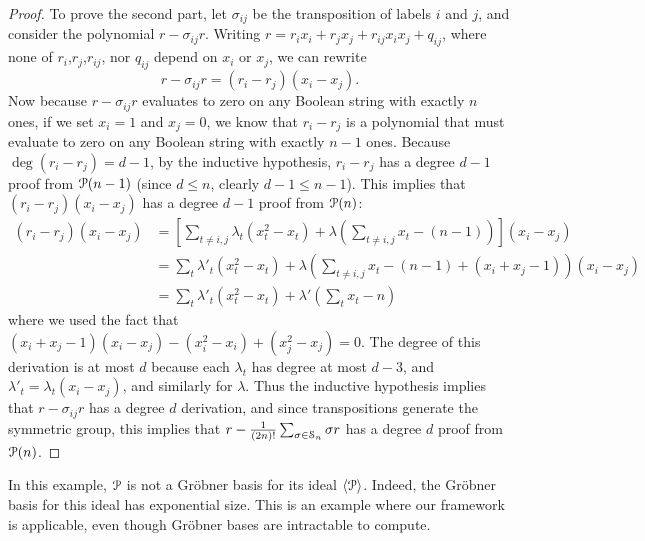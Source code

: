 \documentclass[a4paper,UKenglish]{lipics-v2016}
\begin{document}
\begin{proof}
To prove the second part, let $\sigma_{ij}$ be the transposition of labels $i$ and $j$, and consider the polynomial $r - \sigma_{ij}r$. Writing $r = r_ix_i + r_jx_j + r_{ij}x_ix_j + q_{ij}$, where none of $r_i$,$r_j$,$r_{ij}$, nor $q_{ij}$ depend on $x_i$ or $x_j$, we can rewrite
\[r - \sigma_{ij}r = (r_i - r_j)(x_i - x_j).\]
Now because $r - \sigma_{ij}r$ evaluates to zero on any Boolean string with exactly $n$ ones, if we set $x_i = 1$ and $x_j = 0$, we know that $r_i - r_j$ is a polynomial that must evaluate to zero on any Boolean string with exactly $n-1$ ones. Because $\deg (r_i - r_j) = d-1$, by the inductive hypothesis, $r_i - r_j$ has a degree $d-1$ proof from $\mathcal P(n-1)$ (since $d \leq n$, clearly $d-1 \leq n-1$). This implies that $(r_i - r_j)(x_i - x_j)$ has a degree $d-1$ proof from $\mathcal P(n)$:
\begin{align*}
(r_i - r_j)(x_i - x_j) &= \left[\sum_{t \neq i,j} \lambda_t(x_t^2 - x_t) + \lambda \left(\sum_{t \neq i,j} x_t - (n-1)\right)\right](x_i - x_j) \\
&= \sum_{t} \lambda'_t (x_t^2 - x_t) + \lambda \left(\sum_{t \neq i,j} x_t - (n-1) + (x_i + x_j - 1)\right)(x_i - x_j)\\
&= \sum_t \lambda'_t (x_t^2 - x_t) +\lambda' \left(\sum_t x_t - n\right)
\end{align*}
where we used the fact that $(x_i + x_j - 1)(x_i - x_j) - (x_i^2 - x_i) + (x_j^2 - x_j) = 0$. The degree of this derivation is at most $d$ because each $\lambda_t$ has degree at most $d-3$, and $\lambda'_t = \lambda_t(x_i - x_j)$, and similarly for $\lambda$. Thus the inductive hypothesis implies that $r - \sigma_{ij}r$ has a degree $d$ derivation, and since transpositions generate the symmetric group, this implies that $r - \frac{1}{(2n)!}\sum_{\sigma \in \mathcal S_n} \sigma r$ has a degree $d$ proof from $\mathcal P(n)$.
\end{proof}

\begin{remark}
In this example, $\mathcal P$ is not a Gr\"obner basis for its ideal $\langle \mathcal P \rangle$. 
Indeed, the Gr\"obner basis for this ideal has exponential size. This is an example where our framework is applicable, even though Gr\"obner bases are intractable to compute. 
\end{remark}





\end{document}

